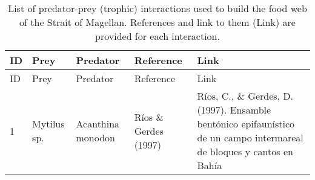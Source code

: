 \documentclass[
]{article}
\begin{document}
\newpage
\begin{landscape}

\begin{longtable}[]{@{}
  >{\raggedright\arraybackslash}p{}
  >{\raggedright\arraybackslash}p{}
  >{\raggedright\arraybackslash}p{}
  >{\raggedright\arraybackslash}p{}
  >{\raggedleft\arraybackslash}p{}@{}}
\caption{List of predator-prey (trophic) interactions used to build the
food web of the Strait of Magellan. References and link to them (Link)
are provided for each interaction.}\tabularnewline
\toprule\noalign{}
\begin{minipage}[b]{\linewidth}\raggedright
ID
\end{minipage} & \begin{minipage}[b]{\linewidth}\raggedright
Prey
\end{minipage} & \begin{minipage}[b]{\linewidth}\raggedright
Predator
\end{minipage} & \begin{minipage}[b]{\linewidth}\raggedright
Reference
\end{minipage} & \begin{minipage}[b]{\linewidth}\raggedleft
Link
\end{minipage} \\
\midrule\noalign{}
\endfirsthead
\toprule\noalign{}
\begin{minipage}[b]{\linewidth}\raggedright
ID
\end{minipage} & \begin{minipage}[b]{\linewidth}\raggedright
Prey
\end{minipage} & \begin{minipage}[b]{\linewidth}\raggedright
Predator
\end{minipage} & \begin{minipage}[b]{\linewidth}\raggedright
Reference
\end{minipage} & \begin{minipage}[b]{\linewidth}\raggedleft
Link
\end{minipage} \\
\midrule\noalign{}
\endhead
\bottomrule\noalign{}
\endlastfoot
\tiny 1 & \tiny Mytilus sp. & \tiny Acanthina monodon & \tiny Ríos \&
Gerdes (1997) & \tiny Ríos, C., \& Gerdes, D. (1997). Ensamble bentónico
epifaunístico de un campo intermareal de bloques y cantos en Bahía

\end{longtable}
\end{landscape}
\end{document}
